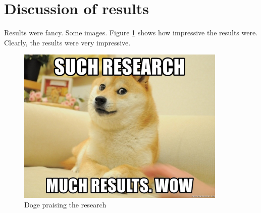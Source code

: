 
\section{Discussion of results}
Results were fancy. Some images. Figure \ref{fig:doge_results} shows how impressive the results were.
Clearly, the results were very impressive.
\begin{figure}[!ht]
    \centering
    \includegraphics[width= 100mm]{images/wow_doge.jpg}
    \caption{Doge praising the research \label{fig:doge_results}}
\end{figure}